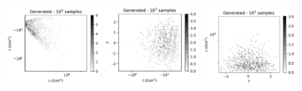 \documentclass[twocolumn,preprintnumbers,superscriptaddress]{revtex4-2}
\begin{document}

\begin{figure}
  \includegraphics[width=0.32\textwidth]{plots/hardware/ibm_santiago/s-t_FAKE_IBM_1k.pdf}%
  \includegraphics[width=0.32\textwidth]{plots/hardware/ibm_santiago/t-y_FAKE_IBM_1k.pdf}%
  \includegraphics[width=0.32\textwidth]{plots/hardware/ibm_santiago/y-s_FAKE_IBM_1k.pdf}


\end{figure}
\end{document}
